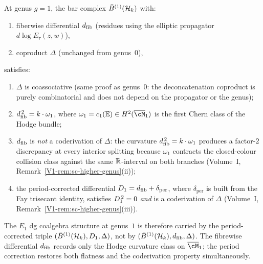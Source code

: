 \begin{theorem}
\label{thm:rosetta-curved}
At genus $g = 1$, the bar complex $\bar{B}^{(1)}(\mathcal{H}_k)$ with:
\begin{enumerate}[label=\textup{(\roman*)}]
\item fiberwise differential $d_{\mathrm{fib}}$ \textup{(}residues using
 the elliptic propagator $d\log E_\tau(z, w)$\textup{)},
\item coproduct $\Delta$ \textup{(}unchanged from genus~$0$\textup{)},
\end{enumerate}
satisfies:
\begin{enumerate}[label=\textup{(\alph*)}]
\item\label{item:rosetta-curved-delta}
 $\Delta$ is coassociative \textup{(}same proof as genus~$0$:
 the deconcatenation coproduct is purely combinatorial and
 does not depend on the propagator or the genus\textup{)};
\item\label{item:rosetta-curved-dsquared}
 $d_{\mathrm{fib}}^{\,2} = k \cdot \omega_1$, where
 $\omega_1 = c_1(\mathbb{E}) \in H^2(\overline{\cM}_1)$
 is the first Chern class of the Hodge bundle;
\item\label{item:rosetta-curved-coder}
 $d_{\mathrm{fib}}$ is \emph{not} a coderivation of $\Delta$: the
 curvature $d_{\mathrm{fib}}^{\,2} = k\cdot\omega_1$ produces a
 factor-$2$ discrepancy at every interior splitting because
 $\omega_1$ contracts the closed-colour collision class
 against the same $\mathbb{R}$-interval on both branches
 (Volume~I,
 Remark~\ref{V1-rem:sc-higher-genus}\textup{(ii)});
\item\label{item:rosetta-curved-corrected}
 the period-corrected differential
 $D_{1} = d_{\mathrm{fib}} + \delta_{\mathrm{per}}$, where
 $\delta_{\mathrm{per}}$ is built from the Fay trisecant
 identity, satisfies $D_{1}^{\,2} = 0$ \emph{and} is a
 coderivation of $\Delta$ (Volume~I,
 Remark~\ref{V1-rem:sc-higher-genus}\textup{(iii)}).
\end{enumerate}
The $E_1$ dg coalgebra structure at genus~$1$ is therefore
carried by the period-corrected triple
$(\bar{B}^{(1)}(\mathcal{H}_k), D_{1}, \Delta)$, not by
$(\bar{B}^{(1)}(\mathcal{H}_k), d_{\mathrm{fib}}, \Delta)$. The fibrewise
differential $d_{\mathrm{fib}}$ records only the Hodge curvature class on
$\overline{\cM}_1$; the period correction restores both flatness
and the coderivation property simultaneously.
\end{theorem}

